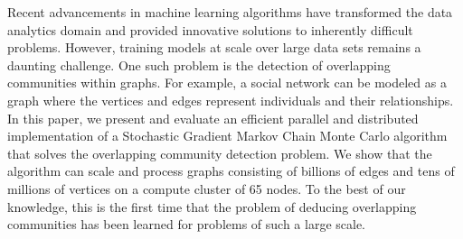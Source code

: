 
Recent advancements in machine learning algorithms have transformed the data
analytics domain and provided innovative solutions to inherently difficult
problems. However, training models at scale over large data sets remains a
daunting challenge. One such problem is the detection of overlapping
communities within graphs. For example, a social network can be modeled as a
graph where the vertices and edges represent individuals and their
relationships. In this paper, we present and evaluate an efficient parallel and
distributed implementation of a Stochastic Gradient Markov Chain Monte Carlo
algorithm that solves the overlapping community detection problem. We show that
the algorithm can scale and process graphs consisting of billions of edges and
tens of millions of vertices on a compute cluster of 65 nodes. To the best of
our knowledge, this is the first time that the problem of deducing overlapping
communities has been learned for problems of such a large scale.

